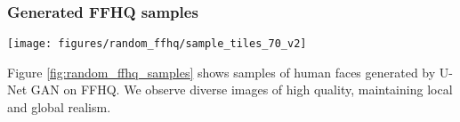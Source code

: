 \documentclass[10pt,twocolumn,letterpaper]{article}
\begin{document}
\subsubsection*{Generated FFHQ samples}
\begin{figure*}
	\begin{centering}
\vspace{-1em}
    \texttt{[image: figures/random\_ffhq/sample\_tiles\_70\_v2]}    	
	\caption{\label{fig:random_ffhq_samples} Images generated by U-Net GAN trained on FFHQ with resolution $256 \times 256$.}
\end{centering}
\end{figure*}



 Figure \ref{fig:random_ffhq_samples} shows samples of human faces generated by U-Net GAN on FFHQ. We observe diverse images of high quality, maintaining local and global realism.
\end{document}
